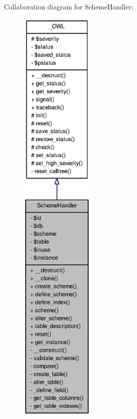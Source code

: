 Collaboration diagram for SchemeHandler:\nopagebreak
\begin{figure}[H]
\begin{center}
\leavevmode
\includegraphics[height=600pt]{classSchemeHandler__coll__graph}
\end{center}
\end{figure}
